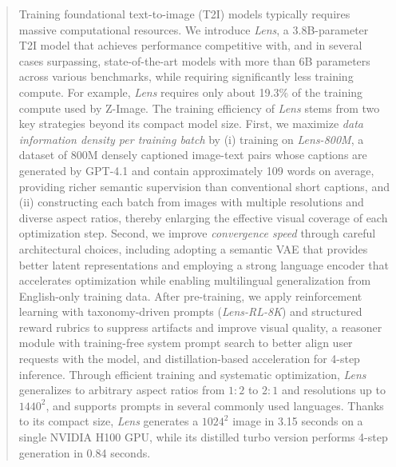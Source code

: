 \begin{abstract}
Training foundational text-to-image (T2I) models typically requires massive computational resources. We introduce \textit{Lens}, a 3.8B-parameter T2I model that achieves performance competitive with, and in several cases surpassing, state-of-the-art models with more than 6B parameters across various benchmarks, while requiring significantly less training compute. For example, \textit{Lens} requires only about 19.3\% of the training compute used by Z-Image. The training efficiency of \textit{Lens} stems from two key strategies beyond its compact model size. First, we maximize \textit{data information density per training batch} by (i) training on \textit{Lens-800M}, a dataset of 800M densely captioned image-text pairs whose captions are generated by GPT-4.1 and contain approximately 109 words on average, providing richer semantic supervision than conventional short captions, and (ii) constructing each batch from images with multiple resolutions and diverse aspect ratios, thereby enlarging the effective visual coverage of each optimization step. Second, we improve \textit{convergence speed} through careful architectural choices, including adopting a semantic VAE that provides better latent representations and employing a strong language encoder that accelerates optimization while enabling multilingual generalization from English-only training data. After pre-training, we apply reinforcement learning with taxonomy-driven prompts (\textit{Lens-RL-8K}) and structured reward rubrics to suppress artifacts and improve visual quality, a reasoner module with training-free system prompt search to better align user requests with the model, and distillation-based acceleration for 4-step inference. Through efficient training and systematic optimization, \textit{Lens} generalizes to arbitrary aspect ratios from $1{:}2$ to $2{:}1$ and resolutions up to $1440^2$, and supports prompts in several commonly used languages. Thanks to its compact size, \textit{Lens} generates a $1024^2$ image in 3.15 seconds on a single NVIDIA H100 GPU, while its distilled turbo version performs 4-step generation in 0.84 seconds.
\end{abstract}


